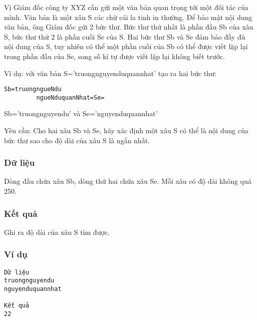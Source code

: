 



   Vị Giám đốc công ty XYZ cần gửi một văn bản quan trọng tới một đối tác của mình. Văn bản là một xâu S các chữ cái la tinh in thường. Để bảo mật nội dung văn bản, ông Giám đốc gửi 2 bức thư. Bức thư thứ nhất là phần đầu Sb của xâu S, bức thư thứ 2 là phần cuối Se của S.  Hai bức thư Sb và Se đảm bảo đầy đủ nội dung của S, tuy nhiên có thể một phần cuối của Sb có thể được viết lặp lại trong phần đầu của Se, song số kí tự được viết lặp lại không biết trước.  

   Ví dụ: với văn bản S=’truongnguyenduquannhat’ tạo ra hai bức thư:  
\begin{verbatim}
Sb=truongngueNdu
         ngueNduquanNhat=Se=
\end{verbatim}

   Sb=’truongnguyendu’ và Se=’nguyenduquannhat’  

   Yêu cầu: Cho hai xâu Sb và Se, hãy xác định một xâu S có thể là nội dung của bức thư sao cho độ dài của xâu S là ngắn nhất.  

\subsubsection{   Dữ liệu  }

   Dòng đầu chứa xâu Sb, dòng thứ hai chứa xâu Se. Mỗi xâu có độ dài không quá 250.  

\subsubsection{   Kết quả  }

   Ghi ra độ dài của xâu S tìm được.  

\subsubsection{   Ví dụ  }
\begin{verbatim}
Dữ liệu
truongnguyendu
nguyenduquannhat

Kết quả
22
\end{verbatim}
